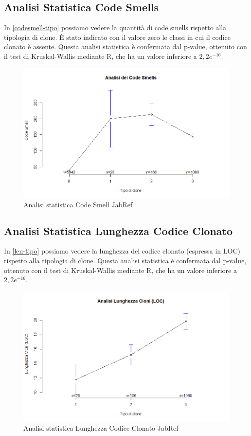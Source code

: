 \subsection{Analisi Statistica Code Smells}
In \autoref{codesmell-tipo} possiamo vedere la quantità di code smells rispetto alla tipologia di clone. È stato indicato con il valore zero le classi in cui il codice clonato è assente. Questa analisi statistica è confermata dal p-value, ottenuto con il test di Kruskal-Wallis mediante R, che ha un valore inferiore a $2,2 e^{-16}$.
\begin{figure}[htbp]
	\centering
	\includegraphics[scale=0.5]{analisi_R/AnalisiJabref/2-gplot-codesmell-type.png}
\caption{Analisi statistica Code Smell JabRef}
\label{codesmell-tipo}
\end{figure}


\subsection{Analisi Statistica Lunghezza Codice Clonato}
In \autoref{len-tipo} possiamo vedere la lunghezza del codice clonato (espressa in LOC) rispetto alla tipologia di clone. Questa analisi statistica è confermata dal p-value, ottenuto con il test di Kruskal-Wallis mediante R, che ha un valore inferiore a $2,2 e^{-16}$. \newpage
\begin{figure}[htbp]
	\centering
	\includegraphics[scale=0.5]{analisi_R/AnalisiJabref/3-gplot-len-type.png}
\caption{Analisi statistica Lunghezza Codice Clonato JabRef}
\label{len-tipo}
\end{figure}
